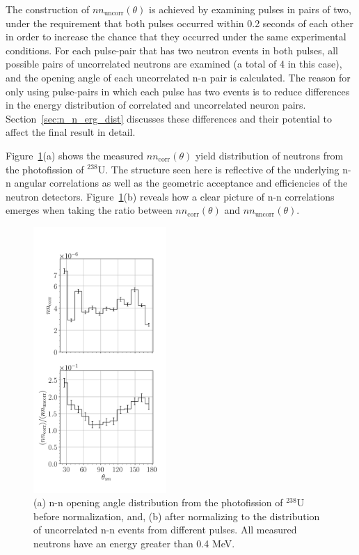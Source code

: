 \documentclass[%
 reprint,
 amsmath,amssymb,
 aps,
 nofootinbib
]{revtex4-1}
\begin{document}
The construction of $nn_{\text{uncorr}}(\theta)$ is achieved by examining pulses in pairs of two, under the requirement that both pulses occurred within 0.2 seconds of each other in order to increase the chance that they occurred under the same experimental conditions.
For each pulse-pair that has two neutron events in both pulses, all possible pairs of uncorrelated neutrons are examined (a total of 4 in this case), and the opening angle of each uncorrelated n-n pair is calculated.
The reason for only using pulse-pairs in which each pulse has two events is to reduce differences in the energy distribution of correlated and uncorrelated neuron pairs.
Section~\ref{sec:n_n_erg_dist} discusses these differences and their potential to affect the final result in detail.

Figure~\ref{fig:SPDPNormalization}(a) shows the measured $nn_{\text{corr}}(\theta)$ yield distribution of neutrons from the photofission of $^{238}$U.
The structure seen here is reflective of the underlying n-n angular correlations as well as the geometric acceptance and efficiencies of the neutron detectors.
Figure~\ref{fig:SPDPNormalization}(b) reveals how a clear picture of n-n correlations emerges when taking the ratio between $nn_{\text{corr}}(\theta)$ and $nn_{\text{uncorr}}(\theta)$.
\begin{figure}[]
\centering
    \includegraphics[width=0.45\textwidth]{SPDPNormalization.png}
    \caption{(a) n-n opening angle distribution from the photofission of $^{238}$U before normalization, and, (b) after normalizing to the distribution of uncorrelated n-n events from different pulses.
    All measured neutrons have an energy greater than 0.4 MeV.}
    \label{fig:SPDPNormalization}
\end{figure}
\end{document}
